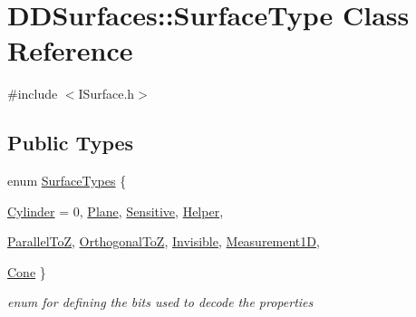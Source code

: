 \hypertarget{class_d_d_surfaces_1_1_surface_type}{
\section{DDSurfaces::SurfaceType Class Reference}
\label{class_d_d_surfaces_1_1_surface_type}
}


{\ttfamily \#include $<$ISurface.h$>$}\subsection*{Public Types}
\begin{DoxyCompactItemize}
\item 
enum \hyperlink{class_d_d_surfaces_1_1_surface_type_a2e946294c5368a34e227be2b17e73051}{SurfaceTypes} \{ \par
\hyperlink{class_d_d_surfaces_1_1_surface_type_a2e946294c5368a34e227be2b17e73051ab7a40aada670ad2c3f61c4c084c996da}{Cylinder} =  0, 
\hyperlink{class_d_d_surfaces_1_1_surface_type_a2e946294c5368a34e227be2b17e73051ac902bc6c754d9eaeb6a128c484340990}{Plane}, 
\hyperlink{class_d_d_surfaces_1_1_surface_type_a2e946294c5368a34e227be2b17e73051a6a5514feab587af0484629aef829554e}{Sensitive}, 
\hyperlink{class_d_d_surfaces_1_1_surface_type_a2e946294c5368a34e227be2b17e73051aaff4ff1e06b875aa08183a72f7b1812d}{Helper}, 
\par
\hyperlink{class_d_d_surfaces_1_1_surface_type_a2e946294c5368a34e227be2b17e73051aedf49a5300dce095439f45b9390faa5f}{ParallelToZ}, 
\hyperlink{class_d_d_surfaces_1_1_surface_type_a2e946294c5368a34e227be2b17e73051ac72842b667410b4ce6e55451902460ee}{OrthogonalToZ}, 
\hyperlink{class_d_d_surfaces_1_1_surface_type_a2e946294c5368a34e227be2b17e73051ad16cb6c378827ded354b01c281dad9e7}{Invisible}, 
\hyperlink{class_d_d_surfaces_1_1_surface_type_a2e946294c5368a34e227be2b17e73051ac1b5b1e22bd7fa94faa46fd4bc03904d}{Measurement1D}, 
\par
\hyperlink{class_d_d_surfaces_1_1_surface_type_a2e946294c5368a34e227be2b17e73051a6c977d222ddf332875c75f8e1eab4fcf}{Cone}
 \}
\begin{DoxyCompactList}\small\item\em enum for defining the bits used to decode the properties \item\end{DoxyCompactList}\end{DoxyCompactItemize}
